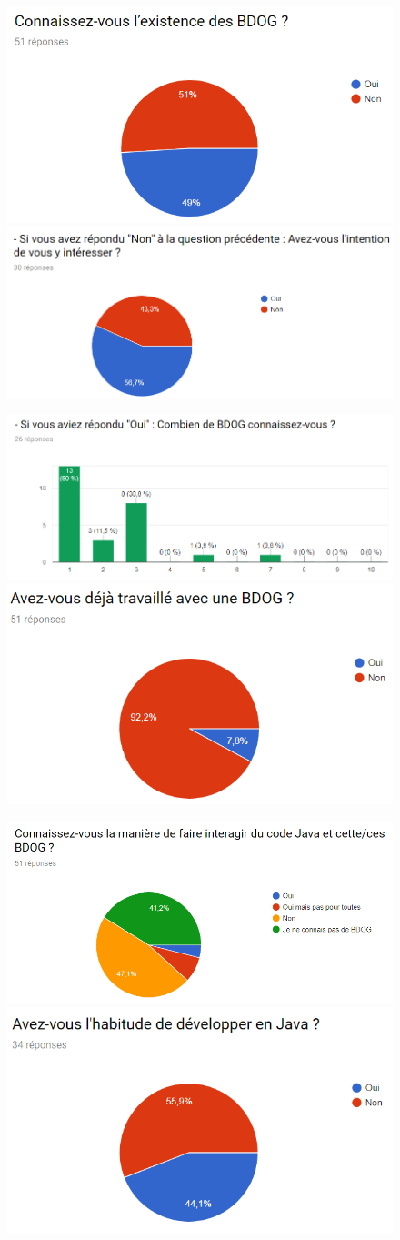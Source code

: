 \documentclass[a4paper,fleqn,12pt,oneside]{report}
\begin{document}
\begin{figure}[htp]
\centering
    \includegraphics[width=.45\textwidth]{figures/5.png}\quad
    \includegraphics[width=.45\textwidth]{figures/6.png}
\end{figure}
\begin{figure}[htp]
\centering
    \includegraphics[width=.45\textwidth]{figures/7.png}\quad
    \includegraphics[width=.45\textwidth]{figures/8.png}
\end{figure}
\begin{figure}[htp]
\centering
    \includegraphics[width=.45\textwidth]{figures/9.png}\quad
    \includegraphics[width=.45\textwidth]{figures/10.png}
\end{figure}
\end{document}
